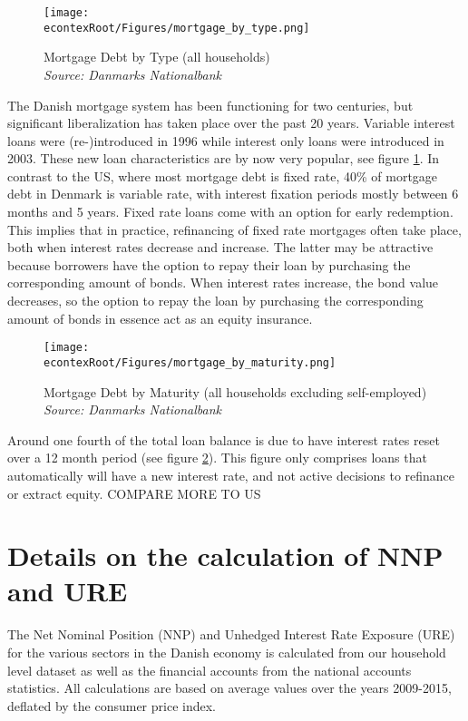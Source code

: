 \documentclass[titlepage]{\econtex}\newcommand{\texname}{ConsumptionHeterogeneity}
\begin{document}
\begin{figure} 
	\begin{centering}
		\texttt{[image: \\econtexRoot/Figures/mortgage\_by\_type.png]} 
		\caption{Mortgage Debt by Type (all households)
		{\\ \emph{\footnotesize
	{Source: Danmarks Nationalbank}}
	}}
		\label{fig:mortgage_by_type}
	\end{centering}
\end{figure}

The Danish mortgage system has been functioning for two centuries, but significant liberalization has taken place over the past 20 years. Variable interest loans were (re-)introduced in 1996 while interest only loans were introduced in 2003. These new loan characteristics are by now very popular, see figure \ref{fig:mortgage_by_type}. In contrast to the US, where most mortgage debt is fixed rate, 40\% of mortgage debt in Denmark is variable rate, with interest fixation periods mostly between 6 months and 5 years. Fixed rate loans come with an option for early redemption. This implies that in practice, refinancing of fixed rate mortgages often take place, both when interest rates decrease and increase. The latter may be attractive because borrowers have the option to repay their loan by purchasing the corresponding amount of bonds. When interest rates increase, the bond value decreases, so the option to repay the loan by purchasing the corresponding amount of bonds in essence act as an equity insurance.  

\begin{figure} 
	\begin{centering}
		\texttt{[image: \\econtexRoot/Figures/mortgage\_by\_maturity.png]} 
		\caption{Mortgage Debt by Maturity (all households excluding self-employed)
		{\\ \emph{\footnotesize
	{Source: Danmarks Nationalbank}}
	}}
		\label{fig:mortgage_by_maturity}
	\end{centering}
\end{figure}

Around one fourth of the total loan balance is due to have interest rates reset over a 12 month period (see figure \ref{fig:mortgage_by_maturity}). This figure only comprises loans that automatically will have a new interest rate, and not active decisions to refinance or extract equity. 
COMPARE MORE TO US

\section{Details on the calculation of NNP and URE}
\setcounter{figure}{0}   
\setcounter{table}{0} 
\label{URE_NNP_appendix}
The Net Nominal Position (NNP) and Unhedged Interest Rate Exposure (URE) for the various sectors in the Danish economy is calculated from our household level dataset as well as the financial accounts from the national accounts statistics. All calculations are based on average values over the years 2009-2015, deflated by the consumer price index. 
\end{document}
